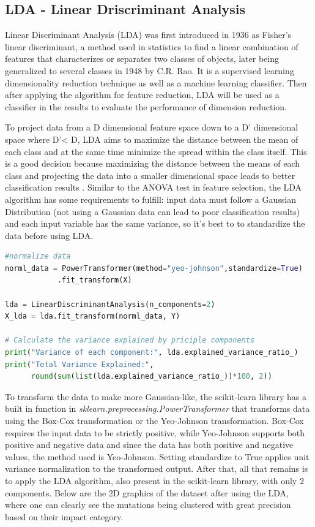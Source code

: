 \subsection{LDA - Linear Driscriminant Analysis} %
\label{sec:lda}
\hspace{10px}Linear Discriminant Analysis (LDA) was first introduced in 1936 as Fisher's linear discriminant, a method used in statistics to find a linear combination of features that characterizes or separates two classes of objects, later being generalized to several classes in 1948 by C.R. Rao. It is a supervised learning dimensionality reduction technique as well as a machine learning classifier. Then after applying the algorithm for feature reduction, LDA will be used as a classifier in the results to evaluate the performance of dimension reduction.

To project data from a D dimensional feature space down to a D’ dimensional space where D'< D, LDA aims to maximize the distance between the mean of each class and at the same time minimize the spread within the class itself. This is a good decision because maximizing the distance between the means of each class and projecting the data into a smaller dimensional space leads to better classification results \cite{Pier}. Similar to the ANOVA test in feature selection, the LDA algorithm has some requirements to fulfill: input data must follow a Gaussian Distribution (not using a Gaussian data can lead to poor classification results) and each input variable has the same variance, so it's best to to standardize the data before using LDA.

\begin{lstlisting}[language=Python]
#normalize data 
norml_data = PowerTransformer(method="yeo-johnson",standardize=True)
            .fit_transform(X)

lda = LinearDiscriminantAnalysis(n_components=2)
X_lda = lda.fit_transform(norml_data, Y)

# Calculate the variance explained by priciple components
print("Variance of each component:", lda.explained_variance_ratio_)
print("Total Variance Explained:", 
      round(sum(list(lda.explained_variance_ratio_))*100, 2))
\end{lstlisting}

To transform the data to make more Gaussian-like, the scikit-learn library has a built in function in \textit{sklearn.preprocessing.PowerTransformer} that transforms data using the Box-Cox transformation or the Yeo-Johnson transformation. Box-Cox requires the input data to be strictly positive, while Yeo-Johnson supports both positive and negative data and since the data has both positive and negative values, the method used is Yeo-Johnson. Setting standardize to True applies unit variance normalization to the transformed output.
After that, all that remains is to apply the LDA algorithm, also present in the scikit-learn library, with only 2 components. Below are the 2D graphics of the dataset after using the LDA, where one can clearly see the mutations being clustered with great precision based on their impact category.

